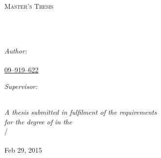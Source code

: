 \documentclass[11pt, a4paper, oneside]{Thesis} %
\begin{document}
\begin{titlepage}
\begin{center}

\textsc{\LARGE \univname}\\[1.5cm] %
\textsc{\Large Master's Thesis}\\[0.5cm] %

\HRule \\[0.4cm] %
{\huge \bfseries \ttitle}\\[0.4cm] %
\HRule \\[1.5cm] %
 
\begin{minipage}{0.45\textwidth}
\begin{flushleft} \large
\emph{Author:}\\
\href{http://www.sleepy-robots.org}{\authornames \\ 09--919--622} %
\end{flushleft}
\end{minipage}
\begin{minipage}{0.45\textwidth}
\begin{flushright} \large
\emph{Supervisor:} \\
\href{http://stoop.ini.uzh.ch}{\supname\linebreak} %
\end{flushright}
\end{minipage}\\[3cm]
 
\large \textit{A thesis submitted in fulfilment of the requirements\\ for the degree of \degreename} %
\textit{in the}\\[0.4cm]
\groupname/\facname\\\deptname\\[2cm] %
 
{\large Feb 29, 2015}\\[2.5cm] %
 
\vfill
\end{center}

\end{titlepage}
\end{document}
